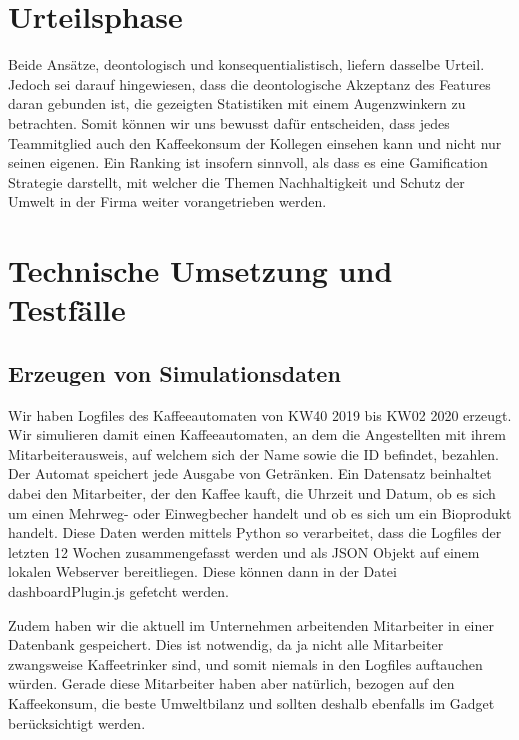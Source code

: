 \documentclass[a4paper,12pt,]{article}
\begin{document}
\section{Urteilsphase}

Beide Ansätze, deontologisch und konsequentialistisch, liefern dasselbe Urteil. Jedoch sei darauf hingewiesen, dass die deontologische Akzeptanz des Features daran gebunden ist, die gezeigten Statistiken mit einem Augenzwinkern zu betrachten. Somit können wir uns bewusst dafür entscheiden, dass jedes Teammitglied auch den Kaffeekonsum der Kollegen einsehen kann und nicht nur seinen eigenen. Ein Ranking ist insofern sinnvoll, als dass es eine Gamification Strategie darstellt, mit welcher die Themen Nachhaltigkeit und Schutz der Umwelt in der Firma weiter vorangetrieben werden.

\section{Technische Umsetzung und Testfälle}

\subsection{Erzeugen von Simulationsdaten}
Wir haben Logfiles des Kaffeeautomaten von KW40 2019 bis KW02 2020 erzeugt. Wir simulieren damit einen Kaffeeautomaten, an dem die Angestellten mit ihrem Mitarbeiterausweis, auf welchem sich der Name sowie die ID befindet, bezahlen. Der Automat speichert jede Ausgabe von Getränken.
Ein Datensatz beinhaltet dabei den Mitarbeiter, der den Kaffee kauft, die Uhrzeit und Datum, ob es sich um einen Mehrweg- oder Einwegbecher handelt und ob es sich um ein Bioprodukt handelt. Diese Daten werden mittels Python so verarbeitet, dass die Logfiles der letzten 12 Wochen zusammengefasst werden und als JSON Objekt auf einem lokalen Webserver bereitliegen. Diese können dann in der Datei dashboardPlugin.js gefetcht werden.

Zudem haben wir die aktuell im Unternehmen arbeitenden Mitarbeiter in einer Datenbank gespeichert. Dies ist notwendig, da ja nicht alle Mitarbeiter zwangsweise Kaffeetrinker sind, und somit niemals in den Logfiles auftauchen würden. Gerade diese Mitarbeiter haben aber natürlich, bezogen auf den Kaffeekonsum, die beste Umweltbilanz und sollten deshalb ebenfalls im Gadget berücksichtigt werden.
\end{document}
